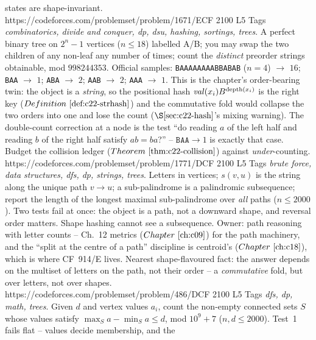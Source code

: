 \begin{mixedset}
{     states are shape-invariant.}
    {https://codeforces.com/problemset/problem/1671/E}{CF 2100 L5}
    {Tags \emph{combinatorics, divide and conquer, dp, dsu, hashing, sortings, trees}. A
     perfect binary tree on \(2^n-1\) vertices (\(n\le 18\)) labelled A/B; you may swap the
     two children of any non-leaf any number of times; count the \emph{distinct} preorder
     strings obtainable, mod \(998244353\). Official samples: \texttt{BAAAAAAAABBABAB}
     (\(n{=}4\)) \(\to\) \(16\); \texttt{BAA} \(\to\) \(1\); \texttt{ABA} \(\to\) \(2\);
     \texttt{AAB} \(\to\) \(2\); \texttt{AAA} \(\to\) \(1\). This is the chapter's
     order-bearing twin: the object is a \emph{string}, so the positional hash
     \(\mathit{val}(x_i)B^{\operatorname{depth}(x_i)}\) is the right key (\(\defref{c22-strhash}\)) and
     the commutative fold would collapse the two orders into one and lose the count
     (\(\secref{c22-hash}\)'s mixing warning). The double-count correction at a node is the
     test ``do reading \(a\) of the left half and reading \(b\) of the right half satisfy
     \(ab=ba\)?'' -- \(\texttt{BAA}\to1\) is exactly that case. Budget the collision
     ledger (\(\thmref{c22-collision}\)) against \emph{under}-counting.}
    {https://codeforces.com/problemset/problem/1771/D}{CF 2100 L5}
    {Tags \emph{brute force, data structures, dfs, dp, strings, trees}. Letters in
     vertices; \(s(v,u)\) is the string along the unique path \(v\to u\); a
     sub-palindrome is a palindromic subsequence; report the length of the longest maximal
     sub-palindrome over \emph{all} paths (\(n\le 2000\)). Two tests fail at once: the
     object is a path, not a downward shape, and reversal order matters. Shape hashing
     cannot see a subsequence. Owner: path reasoning with letter counts -- Ch.~12 metrics
     (\(\chref{c09}\)) for the path machinery, and the ``split at the centre of a path''
     discipline is centroid's (\(\chref{c18}\)), which is where CF~914/E lives. Nearest
     shape-flavoured fact: the answer depends on the multiset of letters on the path, not
     their order -- a \emph{commutative} fold, but over letters, not over shapes.}
    {https://codeforces.com/problemset/problem/486/D}{CF 2100 L5}
    {Tags \emph{dfs, dp, math, trees}. Given \(d\) and vertex values \(a_i\), count the
     non-empty connected sets \(S\) whose values satisfy \(\max_S a-\min_S a\le d\), mod
     \(10^9{+}7\) (\(n,d\le 2000\)). Test~1 fails flat -- values decide membership, and the
}
\end{mixedset}
